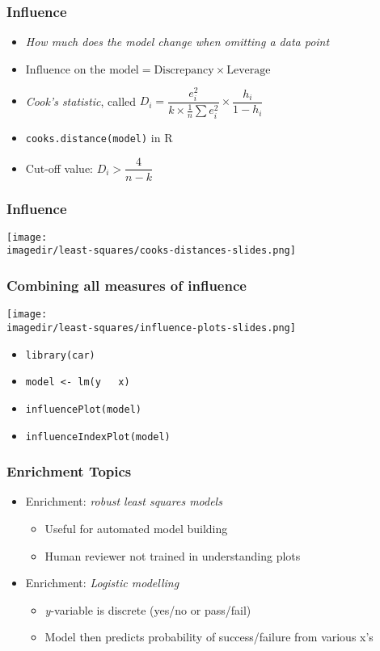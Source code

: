 \begin{frame}\frametitle{Influence}
	\begin{itemize}
		\item	\emph{How much does the model change when omitting a data point}
		\item	$\text{Influence on the model} = \text{Discrepancy} \times \text{Leverage} $
		\item	\emph{Cook's statistic}, called $D_i = \dfrac{e_i^2}{k \times \frac{1}{n}\sum{e_i^2}} \times \dfrac{h_i}{1-h_i} $
		\item	\texttt{cooks.distance(model)} in R
		\item	Cut-off value: $D_i > \dfrac{4}{n-k} $
	\end{itemize}
\end{frame}

\begin{frame}\frametitle{Influence}
	\begin{center}
		\texttt{[image: \\imagedir/least-squares/cooks-distances-slides.png]}
	\end{center}
\end{frame}

\begin{frame}\frametitle{Combining all measures of influence}
	\begin{center}
		\texttt{[image: \\imagedir/least-squares/influence-plots-slides.png]}
	\end{center}
	\begin{itemize}
		\item	\texttt{library(car)}
		\item	\texttt{model <- lm(y \string~ x)}
		\item	\texttt{influencePlot(model)}
		\item	\texttt{influenceIndexPlot(model)}
	\end{itemize}
\end{frame}

\begin{frame}\frametitle{Enrichment Topics}
	\begin{itemize}
		\item	Enrichment: \emph{ robust least squares models}
		\begin{itemize}
			\item	Useful for automated model building
			\item	Human reviewer not trained in understanding plots
		\end{itemize}
		\item	Enrichment: \emph{Logistic modelling}
		\begin{itemize}
			\item	\emph{y}-variable is discrete (yes/no or pass/fail)
			\item	Model then predicts probability of success/failure from various x's
		\end{itemize}
	\end{itemize}
\end{frame}

